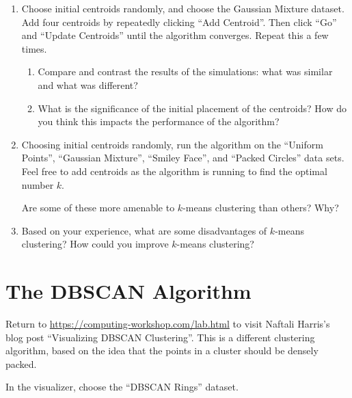 \documentclass[11pt]{article}
\newcommand{\kmc}{$k$-means clustering}
\begin{document}
\begin{enumerate}
\item
  Choose initial centroids randomly, and choose the Gaussian Mixture dataset.
  Add four centroids by repeatedly clicking ``Add Centroid''.
  Then click ``Go'' and ``Update Centroids'' until the algorithm converges.
  Repeat this a few times.

  \begin{enumerate}
    \item
      Compare and contrast the results of the simulations: what was similar and what
      was different?

      \vspace{4em}
    \item
      What is the significance of the initial placement of the centroids?
      How do you think this impacts the performance of the algorithm?

      \vspace{4em}
  \end{enumerate}

\item
  Choosing initial centroids randomly, run the algorithm on the
  ``Uniform Points'', ``Gaussian Mixture'', ``Smiley Face'', and
  ``Packed Circles'' data sets.
  Feel free to add centroids as the algorithm is running to find the optimal
  number $k$.


  Are some of these more amenable to \kmc{} than others? Why?

  \vspace{3em}

\item
  Based on your experience, what are some disadvantages of \kmc?
  How could you improve \kmc?

  \vspace{4em}

\end{enumerate}

\section*{The DBSCAN Algorithm}

Return to \url{https://computing-workshop.com/lab.html} to visit Naftali
Harris's blog post ``Visualizing DBSCAN Clustering''.
This is a different clustering algorithm, based on the idea that the points in a
cluster should be densely packed.

In the visualizer, choose the ``DBSCAN Rings'' dataset.
\end{document}
